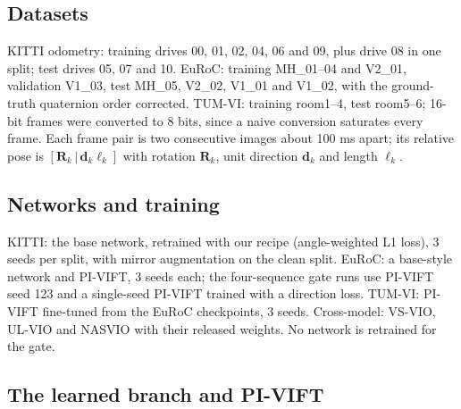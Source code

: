 \documentclass[pdflatex,sn-nature]{sn-jnl}
\begin{document}
\subsection{Datasets}

KITTI odometry\cite{Geiger2012}: training drives 00, 01, 02, 04, 06 and 09, plus drive 08 in one split; test drives 05, 07 and 10. EuRoC\cite{Burri2016}: training MH\_01--04 and V2\_01, validation V1\_03, test MH\_05, V2\_02, V1\_01 and V1\_02, with the ground-truth quaternion order corrected. TUM-VI\cite{Schubert2018}: training room1--4, test room5--6; 16-bit frames were converted to 8 bits, since a naive conversion saturates every frame. Each frame pair is two consecutive images about 100 ms apart; its relative pose is $[\mathbf{R}_k\,|\,\mathbf{d}_k\ell_k]$ with rotation $\mathbf{R}_k$, unit direction $\mathbf{d}_k$ and length $\ell_k$.

\subsection{Networks and training}

KITTI: the base network, retrained with our recipe (angle-weighted L1 loss), 3 seeds per split, with mirror augmentation on the clean split. EuRoC: a base-style network and PI-VIFT, 3 seeds each; the four-sequence gate runs use PI-VIFT seed 123 and a single-seed PI-VIFT trained with a direction loss. TUM-VI: PI-VIFT fine-tuned from the EuRoC checkpoints, 3 seeds. Cross-model: VS-VIO\cite{Yang2022}, UL-VIO\cite{Park2024ULVIO} and NASVIO\cite{Chen2023NASVIO} with their released weights. No network is retrained for the gate.

\subsection{The learned branch and PI-VIFT}\label{sec:learned}
\end{document}
